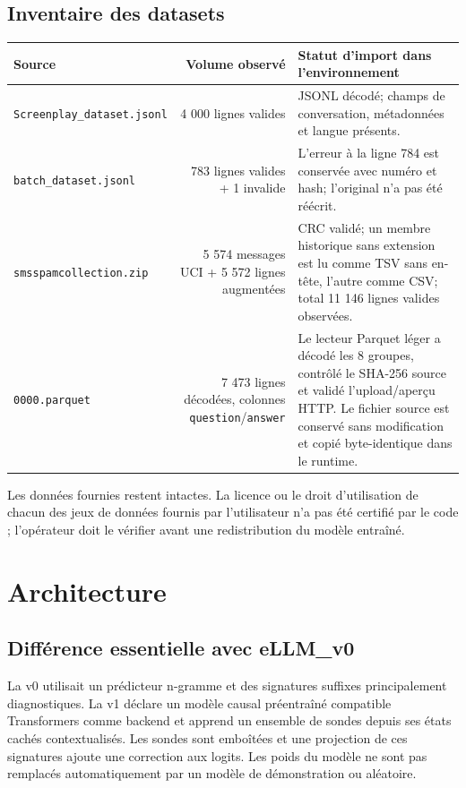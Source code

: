 \documentclass[11pt,a4paper]{article}
\begin{document}
\subsection{Inventaire des datasets}
\begin{center}
\begin{tabularx}{\linewidth}{l r X}
\toprule
\textbf{Source} & \textbf{Volume observé} & \textbf{Statut d'import dans l'environnement}\\\midrule
\texttt{Screenplay\_dataset.jsonl} & 4 000 lignes valides & JSONL décodé; champs de conversation, métadonnées et langue présents.\\
\texttt{batch\_dataset.jsonl} & 783 lignes valides + 1 invalide & L'erreur à la ligne 784 est conservée avec numéro et hash; l'original n'a pas été réécrit.\\
\texttt{smsspamcollection.zip} & 5 574 messages UCI + 5 572 lignes augmentées & CRC validé; un membre historique sans extension est lu comme TSV sans en-tête, l'autre comme CSV; total 11 146 lignes valides observées.\\
\texttt{0000.parquet} & 7 473 lignes décodées, colonnes \texttt{question}/\texttt{answer} & Le lecteur Parquet léger a décodé les 8 groupes, contrôlé le SHA-256 source et validé l’upload/aperçu HTTP. Le fichier source est conservé sans modification et copié byte-identique dans le runtime.\\
\bottomrule
\end{tabularx}
\end{center}
Les données fournies restent intactes. La licence ou le droit d'utilisation de chacun des jeux de données fournis par l'utilisateur n'a pas été certifié par le code ; l'opérateur doit le vérifier avant une redistribution du modèle entraîné.

\section{Architecture}
\subsection{Différence essentielle avec eLLM\_v0}
La v0 utilisait un prédicteur n-gramme et des signatures suffixes principalement diagnostiques. La v1 déclare un modèle causal préentraîné compatible Transformers comme backend et apprend un ensemble de sondes depuis ses états cachés contextualisés. Les sondes sont emboîtées et une projection de ces signatures ajoute une correction aux logits. Les poids du modèle ne sont pas remplacés automatiquement par un modèle de démonstration ou aléatoire.
\end{document}
